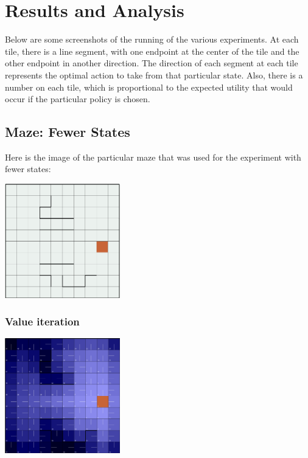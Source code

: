 \documentclass[11pt]{article}
\begin{document}
           
        \section{Results and Analysis}

        Below are some screenshots of the running of the various experiments.
        At each tile, there is a line segment, with one endpoint at the center
        of the tile and the other endpoint in another direction. The direction
        of each segment at each tile represents the optimal action to
        take from that particular state. Also, there is a number on each
        tile, which is proportional to the expected utility that would occur
        if the particular policy is chosen.

        \subsection{Maze: Fewer States}

            Here is the image of the particular maze that was used for the
            experiment with fewer states:

            \includegraphics[width=5cm]{../images/small/maze.PNG}

            \subsubsection{Value iteration}

            \includegraphics[width=5cm]{../images/small/vi.PNG}
\end{document}
